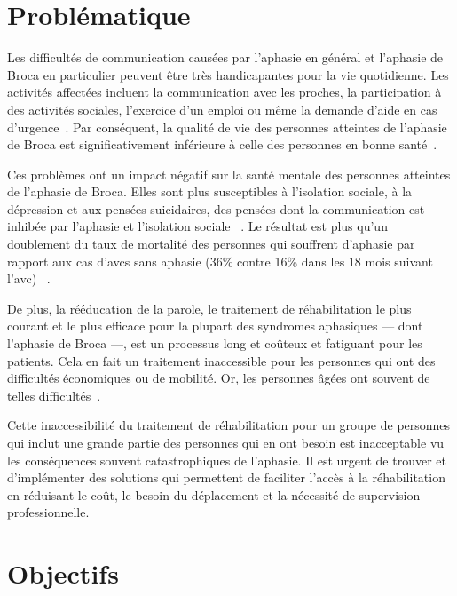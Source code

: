 \section*{Problématique}

Les difficultés de communication causées par l'aphasie en général 
et l'aphasie de Broca en particulier peuvent être très handicapantes pour la vie quotidienne.
Les activités affectées incluent la communication avec les proches, la participation à des activités sociales,
l'exercice d'un emploi ou même la demande d'aide en cas d'urgence~\cite{Hallowell_2017}.
Par conséquent, la qualité de vie des personnes atteintes de l'aphasie de Broca 
est significativement inférieure à celle des personnes en bonne santé~\cite{Pallavi_Perumal_Krupa_2018,Ross_Wertz_2010}.

Ces problèmes ont un impact négatif sur la santé mentale des personnes atteintes de l'aphasie de Broca.
Elles sont plus susceptibles à l'isolation sociale, à la dépression et aux pensées suicidaires,
des pensées dont la communication est inhibée par l'aphasie et l'isolation sociale%
~\cite{Costanza_et_al._2021,Morrison_2016}.
Le résultat est plus qu'un doublement du taux de mortalité des personnes qui souffrent d'aphasie
par rapport aux cas d'\glspl{avc} sans aphasie (36\% contre 16\% dans les 18 mois suivant l'\gls{avc})%
~\cite{Laska_Hellblom_Murray_Kahan_Von_Arbin_2001}.

De plus, la rééducation de la parole, le traitement de réhabilitation le plus courant et le plus efficace 
pour la plupart des syndromes aphasiques --- dont l'aphasie de Broca ---,
est un processus long et coûteux et fatiguant pour les patients.
Cela en fait un traitement inaccessible pour les personnes qui ont des difficultés économiques ou de mobilité.
Or, les personnes âgées ont souvent de telles difficultés~\cite{Jacobs_Ellis_2021,Liu_Huang_Xu_Wu_Tao_Chen_2021}.

Cette inaccessibilité du traitement de réhabilitation pour un groupe de personnes 
qui inclut une grande partie des personnes qui en ont besoin 
est inacceptable vu les conséquences souvent catastrophiques de l'aphasie.
Il est urgent de trouver et d'implémenter des solutions qui permettent de faciliter l'accès à la réhabilitation
en réduisant le coût, le besoin du déplacement et la nécessité de supervision professionnelle.

\section*{Objectifs}

